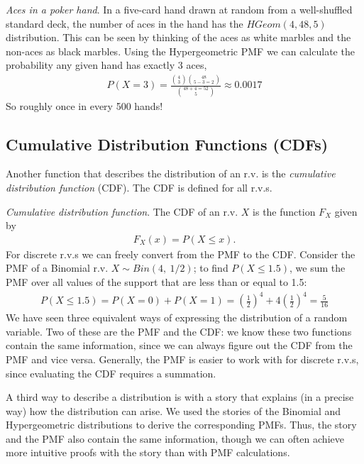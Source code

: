 \documentclass[11pt,a4paper]{article}
\begin{document}
\emph{Aces in a poker hand}. 
In a five-card hand drawn at random from a well-shuffled standard deck, 
the number of aces in the hand has the \(HGeom(4,48,5)\) distribution. 
This can be seen by thinking of the aces as white marbles and the non-aces as black marbles. 
Using the Hypergeometric PMF we can calculate the probability any given hand has exactly 3 aces,
\begin{align}
P(X = 3) = \frac{\binom{4}{3}\binom{48}{5 - 3 = 2}}{\binom{48 + 4 = 52}{5}} \approx 0.0017
\end{align}
So roughly once in every 500 hands!

\subsection{Cumulative Distribution Functions (CDFs)}

Another function that describes the distribution of an r.v. is the 
\emph{cumulative distribution function} (CDF). 
The CDF is defined for all r.v.s.

\emph{Cumulative distribution function}. 
The CDF of an r.v. \(X\) is the function \(F_{X}\) given by
\begin{align}
F_{X}(x) = P(X \leq x).
\end{align}
For discrete r.v.s we can freely convert from the PMF to the CDF.
Consider the PMF of a Binomial r.v. \(X \sim Bin(4,\ 1/2)\); 
to find \(P(X \leq 1.5)\), 
we sum the PMF over all values of the support that are less than or equal to 1.5:
\begin{align}
P(X \leq 1.5) = P(X = 0) + P(X = 1) = 
\left( \frac{1}{2} \right)^{4} + 4\left( \frac{1}{2} \right)^{4} = \frac{5}{16}
\end{align}
We have seen three equivalent ways of expressing the distribution of a random variable. 
Two of these are the PMF and the CDF: 
we know these two functions contain the same information, 
since we can always figure out the CDF from the PMF and vice versa. 
Generally, the PMF is easier to work with for discrete r.v.s, 
since evaluating the CDF requires a summation.

A third way to describe a distribution is with a story that explains (in
a precise way) how the distribution can arise. 
We used the stories of
the Binomial and Hypergeometric distributions to derive the
corresponding PMFs. 
Thus, the story and the PMF also contain the same information, 
though we can often achieve more intuitive proofs with the
story than with PMF calculations.
\end{document}
